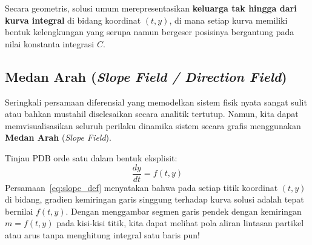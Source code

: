 \documentclass[11pt,a4paper]{article}
\theoremstyle{definition}
\begin{document}
Secara geometris, solusi umum merepresentasikan \textbf{keluarga tak hingga dari kurva integral} di bidang koordinat $(t, y)$, di mana setiap kurva memiliki bentuk kelengkungan yang serupa namun bergeser posisinya bergantung pada nilai konstanta integrasi $C$.

\subsection{Medan Arah (\textit{Slope Field / Direction Field})}
Seringkali persamaan diferensial yang memodelkan sistem fisik nyata sangat sulit atau bahkan mustahil diselesaikan secara analitik tertutup. Namun, kita dapat memvisualisasikan seluruh perilaku dinamika sistem secara grafis menggunakan \textbf{Medan Arah} (\textit{Slope Field}).

Tinjau PDB orde satu dalam bentuk eksplisit:
\begin{equation}
    \frac{dy}{dt} = f(t, y)
    \label{eq:slope_def}
\end{equation}
Persamaan~\eqref{eq:slope_def} menyatakan bahwa pada setiap titik koordinat $(t, y)$ di bidang, gradien kemiringan garis singgung terhadap kurva solusi adalah tepat bernilai $f(t, y)$. Dengan menggambar segmen garis pendek dengan kemiringan $m = f(t, y)$ pada kisi-kisi titik, kita dapat melihat pola aliran lintasan partikel atau arus tanpa menghitung integral satu baris pun!
\end{document}
